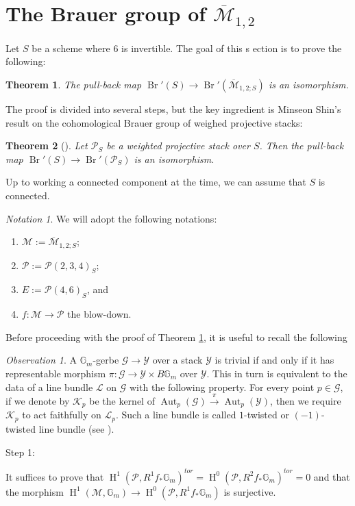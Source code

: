 \documentclass[11pt]{amsart}
\newtheorem{theorem}{Theorem}[section]
\theoremstyle{definition}
\theoremstyle{remark}
\newtheorem{notation}{Notation}
\newtheorem{observation}{Observation}
\newcounter{step}
\newcommand{\calM}{\mathcal M}
\newcommand{\calL}{\mathcal L}
\newcommand{\calP}{\mathcal P}
\newcommand{\sG}{\mathscr{G}}
\newcommand{\sK}{\mathscr{K}}
\newcommand{\sY}{\mathscr{Y}}
\newcommand{\bG}{\mathbb{G}}
\newcommand{\oH}{\operatorname{H}}
\begin{document}
\section{The Brauer group of $\overline{\calM}_{1,2}$}
Let $S$ be a scheme where $6$ is invertible. The goal of this s ection is to prove the following:
\begin{theorem}\label{teo_brauer}
The pull-back map $\operatorname{Br}'(S)\to \operatorname{Br}'(\overline{\calM}_{1,2;S})$ is an isomorphism.\end{theorem}
The proof is divided into several steps, but the key ingredient is Minseon Shin's result on the cohomological Brauer group of weighed projective stacks:
\begin{theorem}[\cite{Minseon}]Let $\calP_S$ be a weighted projective stack over $S$. Then the pull-back map
$ \operatorname{Br}'(S)\to \operatorname{Br}'(\calP_S)$ is an isomorphism.
\end{theorem}
Up to working a connected component at the time, we can assume that $S$ is connected. 
\begin{notation}We will adopt the following notations:
\begin{enumerate}
    \item $\calM:=\overline{\calM}_{1,2;S}$;
    \item $\calP:=\calP(2,3,4)_S$;
    \item $E:= \calP(4,6)_S$, and
    \item $f:\calM\to \calP$ the blow-down.
\end{enumerate}\end{notation}

Before proceeding with the proof of Theorem \ref{teo_brauer}, it is useful to recall the following \begin{observation}\label{oss_trivial_gerbe_is_1_twisted}
A $\bG_m$-gerbe $\sG \to \sY$
over a stack $\sY$ is trivial if and only if it has representable morphism $\pi:\sG\to \sY\times B\bG_m $ over $\sY$. This in turn is equivalent to the data of a line bundle $\calL$ on $\sG$ with the following property. For every point $p\in \sG$, if we denote by $\sK_p$ be the kernel of $\operatorname{Aut}_p(\sG) \xrightarrow{\pi} \operatorname{Aut}_p(\sY)$, then we require $\sK_p$ to act faithfully on $\calL_p$. Such a line bundle is called $1$-twisted or $(-1)$-twisted line bundle (see \cite[Lemma 3.1.1.8]{Lieb08}).
\end{observation}


\begin{bf}Step 1:\end{bf} It suffices to prove that $\oH^1(\calP, R^1f_*\bG_m)^{tor} = \oH^0(\calP, R^2f_*\bG_m)^{tor}=0$ and that the morphism $\oH^1(\calM, \bG_m)\to \oH^0(\calP, R^1f_*\bG_m)$ is surjective.
\end{document}
